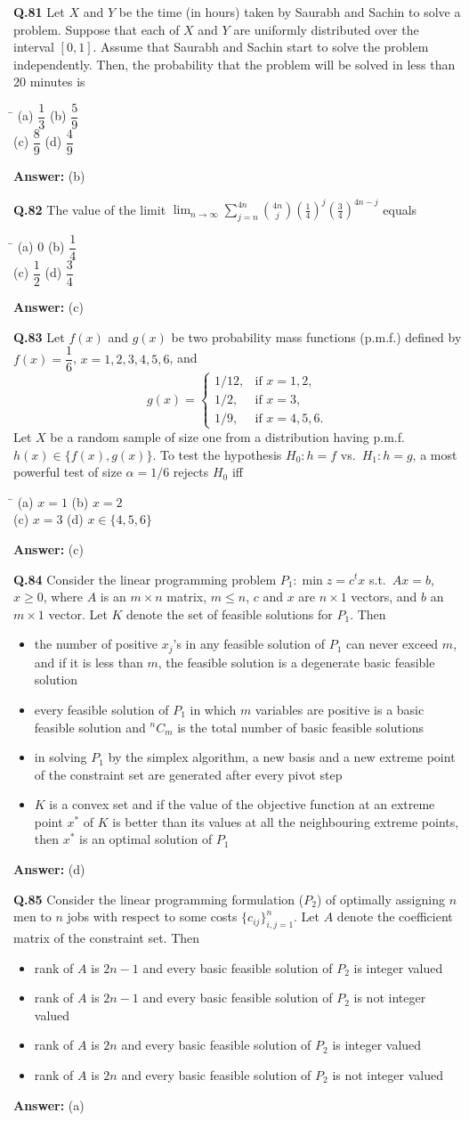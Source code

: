 \documentclass[11pt,a4paper]{article}
\newcommand{\optsfour}[4]{%
  \begin{tabbing}
    \hspace{0.48\linewidth}\=\kill
    (a) #1 \> (b) #2 \\[2pt]
    (c) #3 \> (d) #4
  \end{tabbing}%
}
\newcommand{\optslist}[4]{%
  \begin{itemize}
    \setlength{\itemsep}{2pt}\setlength{\parskip}{0pt}
    \item[(a)] #1
    \item[(b)] #2
    \item[(c)] #3
    \item[(d)] #4
  \end{itemize}%
}
\newcommand{\ans}[1]{\textbf{Answer:} #1\par\medskip}
\begin{document}
\textbf{Q.81} Let $X$ and $Y$ be the time (in hours) taken by Saurabh and Sachin to solve a problem. Suppose that each of $X$ and $Y$ are uniformly distributed over the interval $[0, 1]$. Assume that Saurabh and Sachin start to solve the problem independently. Then, the probability that the problem will be solved in less than $20$ minutes is
\optsfour{$\dfrac{1}{3}$}{$\dfrac{5}{9}$}{$\dfrac{8}{9}$}{$\dfrac{4}{9}$}
\ans{(b)}

\textbf{Q.82} The value of the limit $\displaystyle\lim_{n\to\infty} \sum_{j=n}^{4n} \binom{4n}{j} \left(\frac{1}{4}\right)^j \left(\frac{3}{4}\right)^{4n-j}$ equals
\optsfour{$0$}{$\dfrac{1}{4}$}{$\dfrac{1}{2}$}{$\dfrac{3}{4}$}
\ans{(c)}

\textbf{Q.83} Let $f(x)$ and $g(x)$ be two probability mass functions (p.m.f.) defined by $f(x) = \dfrac{1}{6}$, $x = 1, 2, 3, 4, 5, 6$, and
\[
  g(x) = \begin{cases} 1/12, & \text{if } x = 1, 2, \\ 1/2, & \text{if } x = 3, \\ 1/9, & \text{if } x = 4, 5, 6. \end{cases}
\]
Let $X$ be a random sample of size one from a distribution having p.m.f.\ $h(x) \in \{f(x), g(x)\}$. To test the hypothesis $H_0 : h = f$ vs.\ $H_1 : h = g$, a most powerful test of size $\alpha = 1/6$ rejects $H_0$ iff
\optsfour{$x = 1$}{$x = 2$}{$x = 3$}{$x \in \{4, 5, 6\}$}
\ans{(c)}

\textbf{Q.84} Consider the linear programming problem $P_1 : \min z = c^t x$ s.t.\ $Ax = b$, $x \ge 0$, where $A$ is an $m \times n$ matrix, $m \le n$, $c$ and $x$ are $n \times 1$ vectors, and $b$ an $m \times 1$ vector. Let $K$ denote the set of feasible solutions for $P_1$. Then
\optslist{the number of positive $x_j$'s in any feasible solution of $P_1$ can never exceed $m$, and if it is less than $m$, the feasible solution is a degenerate basic feasible solution}{every feasible solution of $P_1$ in which $m$ variables are positive is a basic feasible solution and ${}^nC_m$ is the total number of basic feasible solutions}{in solving $P_1$ by the simplex algorithm, a new basis and a new extreme point of the constraint set are generated after every pivot step}{$K$ is a convex set and if the value of the objective function at an extreme point $x^*$ of $K$ is better than its values at all the neighbouring extreme points, then $x^*$ is an optimal solution of $P_1$}
\ans{(d)}

\textbf{Q.85} Consider the linear programming formulation ($P_2$) of optimally assigning $n$ men to $n$ jobs with respect to some costs $\{c_{ij}\}_{i,j=1}^n$. Let $A$ denote the coefficient matrix of the constraint set. Then
\optslist{rank of $A$ is $2n - 1$ and every basic feasible solution of $P_2$ is integer valued}{rank of $A$ is $2n - 1$ and every basic feasible solution of $P_2$ is not integer valued}{rank of $A$ is $2n$ and every basic feasible solution of $P_2$ is integer valued}{rank of $A$ is $2n$ and every basic feasible solution of $P_2$ is not integer valued}
\ans{(a)}
\end{document}
